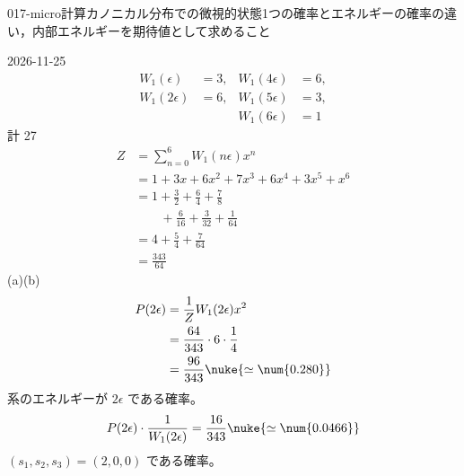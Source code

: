 \documentclass[uplatex,dvipdfmx,a4paper,11pt]{jsarticle}
\begin{document}
\begin{mondai}{017-micro}{計算}{カノニカル分布での微視的状態1つの確率とエネルギーの確率の違い，内部エネルギーを期待値として求めること}
\begin{kotaeutsushi}{2026-11-25}
\begin{align*}
W_{1}(\epsilon)&=3, & W_{1}(4\epsilon)&=6,\\
W_{1}(2\epsilon)&=6, & W_{1}(5\epsilon)&=3,\\
& & W_{1}(6\epsilon)&=1
\end{align*}
計 27
\begin{align*}
Z&=\sum_{n=0}^{6}W_{1}(n\epsilon)x^{n}\\
&=1+3x+6x^{2}+7x^{3}+6x^{4}+3x^{5}+x^{6}\\
&=1+\frac{3}{2}+\frac{6}{4}+\frac{7}{8}\\
&\qquad+\frac{6}{16}+\frac{3}{32}+\frac{1}{64}\\
&=4+\frac{5}{4}+\frac{7}{64}\\
&=\frac{343}{64}
\end{align*}
(a)(b)
\begin{align*}
P(2\epsilon)&=\frac{1}{Z}W_{1}(2\epsilon)x^{2}\\
&=\frac{64}{343}\cdot6\cdot\frac{1}{4}\\
&=\frac{96}{343}\nuke{\simeq\num{0.280}}
\end{align*}
系のエネルギーが $2\epsilon$ である確率。
\[ P(2\epsilon)\cdot\frac{1}{W_{1}(2\epsilon)}=\frac{16}{343}\nuke{\simeq\num{0.0466}} \]
$(s_{1},s_{2},s_{3})=(2,0,0)$ である確率。


\end{kotaeutsushi}
\end{mondai}
\end{document}
